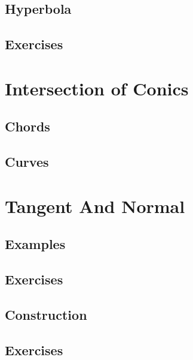 \documentclass[journal]{IEEEtran}
\begin{document}
\section{Hyperbola}

\section{Exercises}


\chapter{Intersection of Conics}
\section{Chords }

\section{Curves}

%
\chapter{Tangent And Normal}
\section{Examples}

\section{Exercises}

\section{Construction}

\section{Exercises}

\fi
%
\end{document}

